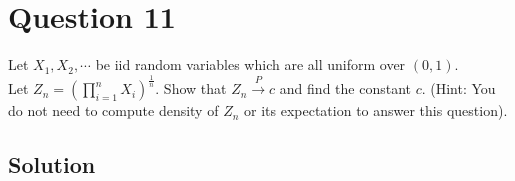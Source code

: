 \section*{Question 11}

Let \( X_{1}, X_{2}, \cdots \) be iid random variables which are all uniform over \( (0,1) \). \\
Let \( Z_{n}={\left(\prod_{i=1}^{n} X_{i}\right)}^{\frac{1}{n}} \).
Show that \( Z_{n} \xrightarrow{P} c \) and find the constant \( c \).
(Hint: You do not need to compute density of \( Z_{n} \) or its expectation to answer this question).

\subsection*{Solution}
